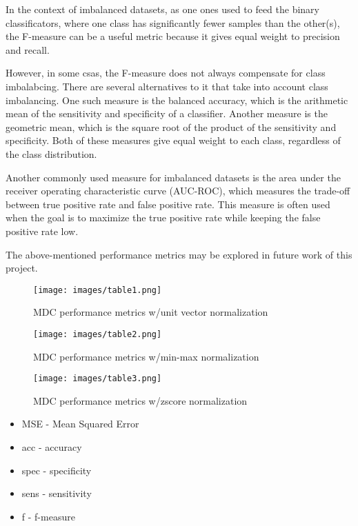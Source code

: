 \documentclass[12pt, a4paper]{article}
\begin{document}
In the context of imbalanced datasets, as one ones used to feed the binary classificators, where one class has significantly fewer samples than the other(s), the F-measure can be a useful metric because it gives equal weight to precision and recall. 

However, in some csas, the F-measure does not always compensate for class imbalabcing. There are several alternatives to it that take into account class imbalancing. One such measure is the balanced accuracy, which is the arithmetic mean of the sensitivity and specificity of a classifier. Another measure is the geometric mean, which is the square root of the product of the sensitivity and specificity. Both of these measures give equal weight to each class, regardless of the class distribution.

Another commonly used measure for imbalanced datasets is the area under the receiver operating characteristic curve (AUC-ROC), which measures the trade-off between true positive rate and false positive rate. This measure is often used when the goal is to maximize the true positive rate while keeping the false positive rate low.

The above-mentioned performance metrics may be explored in future work of this project.

\vspace{1cm}

\begin{figure}[H]
\centering
\texttt{[image: images/table1.png]}
\caption{MDC performance metrics w/unit vector normalization}
\label{fig:myimage}
\end{figure}

\begin{figure}[H]
\centering
\texttt{[image: images/table2.png]}
\caption{MDC performance metrics w/min-max normalization}
\label{fig:myimage}
\end{figure}

\begin{figure}[H]
\centering
\texttt{[image: images/table3.png]}
\caption{MDC performance metrics w/zscore normalization}
\label{fig:myimage}
\end{figure}

\small{
\begin{itemize}
    \item 
     MSE - Mean Squared Error
    \item 
     acc - accuracy
    \item 
     spec - specificity
    \item 
     sens - sensitivity
    \item 
     f - f-measure
\end{itemize}
}
\end{document}

